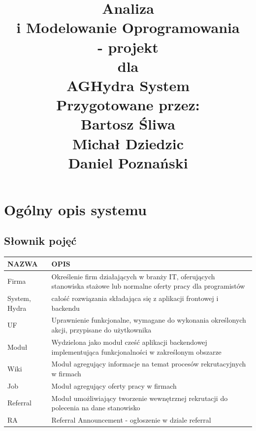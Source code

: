 \documentclass[oneside]{scrreprt}
\title{%
\flushright
\Huge{Analiza\\ i Modelowanie Oprogramowania \\ - projekt}\\
\vspace{2cm}
dla\\
\vspace{2cm}
AGHydra System\\
\vspace{2cm}
Przygotowane przez:\\
Bartosz Śliwa\\
Michał Dziedzic\\
Daniel Poznański\\
}
\date{}
\begin{document}
\maketitle
\tableofcontents
\chapter{Ogólny opis systemu}

\section{Słownik pojęć}
\begin{table}[ht]
	\centering
	\begin{tabular}{p{4cm}p{8cm}}
		\textbf{NAZWA}                     & \textbf{OPIS}                                                                                                       \\ \hline
		\multicolumn{1}{l|}{Firma}         & Określenie firm działających w branży IT, oferujących stanowiska stażowe lub normalne oferty pracy dla programistów \\ \hline
		\multicolumn{1}{l|}{System, Hydra} & całość rozwiązania składająca się z aplikacji frontowej i backendu                                                  \\ \hline
		\multicolumn{1}{l|}{UF}            & Uprawnienie funkcjonalne, wymagane do wykonania określonych akcji, przypisane do użytkownika                        \\ \hline
		\multicolumn{1}{l|}{Moduł}         & Wydzielona jako moduł cześć aplikacji backendowej implementująca funkcjonalności w zakreślonym obszarze             \\ \hline
		\multicolumn{1}{l|}{Wiki}          & Moduł agregujący informacje na temat procesów rekrutacyjnych w firmach                                              \\ \hline
		\multicolumn{1}{l|}{Job}           & Moduł agregujący oferty pracy w firmach                                                                             \\ \hline
		\multicolumn{1}{l|}{Referral}      & Moduł umożliwiający tworzenie wewnętrznej rekrutacji do polecenia na dane stanowisko                                \\ \hline
		\multicolumn{1}{l|}{RA}            & Referral Announcement - ogłoszenie w dziale referral                                                                \\ \hline
	\end{tabular}
\end{table}
\end{document}

